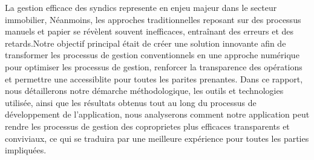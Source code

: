 La gestion efficace des syndics represente en enjeu majeur dans le secteur immobilier, Néanmoins, les approches traditionnelles reposant sur des processus manuels et papier se révèlent souvent inefficaces, entraînant des erreurs et des retards.Notre objectif principal était de créer une solution innovante afin de transformer les processus de gestion conventionnels en une approche numérique pour optimiser les processus de gestion, renforcer la transparence des opérations et permettre une accessiblite pour toutes les parites prenantes.
Dans ce rapport, nous détaillerons notre démarche méthodologique, les outils et technologies utilisée, ainsi que les résultats obtenus tout au long du processus de développement de l'application, nous analyserons comment notre application peut rendre les processus de gestion des coproprietes plus efficaces transparents et conviviaux, ce qui se traduira par une meilleure expérience pour toutes les parties impliquées.
